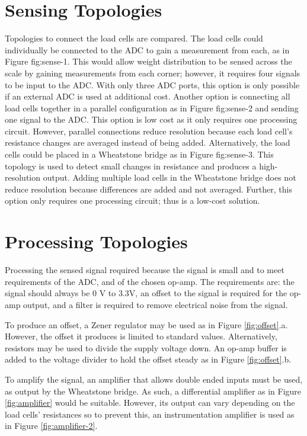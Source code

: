 \section{Sensing Topologies}

Topologies to connect the load cells are compared. The load cells could individually be connected to the ADC to gain a measurement from each, as in Figure {fig:sense-1}. This would allow weight distribution to be sensed across the scale by gaining measurements from each corner; however, it requires four signals to be input to the ADC. With only three ADC ports, this option is only possible if an external ADC is used at additional cost. Another option is connecting all load cells together in a parallel configuration as in Figure {fig:sense-2} and sending one signal to the ADC. This option is low cost as it only requires one processing circuit. However, parallel connections reduce resolution because each load cell's resistance changes are averaged instead of being added. Alternatively, the load cells could be placed in a Wheatstone bridge as in Figure {fig:sense-3}. This topology is used to detect small changes in resistance and produces a high-resolution output. Adding multiple load cells in the Wheatstone bridge does not reduce resolution because differences are added and not averaged. Further, this option only requires one processing circuit; thus is a low-cost solution. 



\section{Processing Topologies}

Processing the sensed signal required because the signal is small and to meet requirements of the ADC, and of the chosen op-amp. The requirements are: the signal should always be 0 V to 3.3V, an offset to the signal is required for the op-amp output, and a filter is required to remove electrical noise from the signal.

To produce an offset, a Zener regulator may be used as in Figure \ref{fig:offset}.a. However, the offset it produces is limited to standard values. Alternatively, resistors may be used to divide the supply voltage down. An op-amp buffer is added to the voltage divider to hold the offset steady as in Figure \ref{fig:offset}.b.

To amplify the signal, an amplifier that allows double ended inputs must be used, as output by the Wheatstone bridge. As such, a differential amplifier as in Figure \ref{fig:amplifier} would be suitable. However, its output can vary depending on the load cells' resistances so to prevent this, an instrumentation amplifier is used as in Figure \ref{fig:amplifier-2}.

